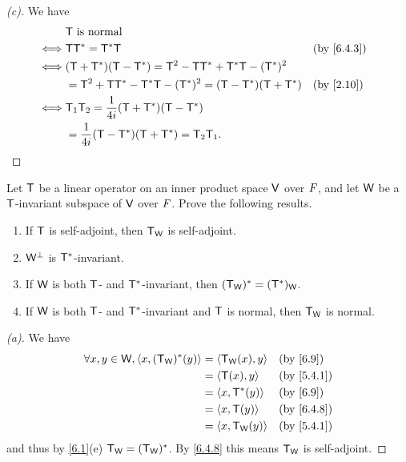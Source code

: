 \begin{proof}[(c)]
  We have
  \begin{align*}
         & \T \text{ is normal}                                                            \\
    \iff & \T \T^* = \T^* \T                                               &  & \by{6.4.3} \\
    \iff & (\T + \T^*) (\T - \T^*) = \T^2 - \T \T^* + \T^* \T - (\T^*)^2                   \\
         & = \T^2 + \T \T^* - \T^* \T - (\T^*)^2 = (\T - \T^*) (\T + \T^*) &  & \by{2.10}  \\
    \iff & \T_1 \T_2 = \frac{1}{4i} (\T + \T^*) (\T - \T^*)                                \\
         & = \frac{1}{4i} (\T - \T^*) (\T + \T^*) = \T_2 \T_1.
  \end{align*}
\end{proof}

\begin{ex}\label{ex:6.4.7}
  Let \(\mathsf{T}\) be a linear operator on an inner product space \(\mathsf{V}\) over \(\mathit{F}\), and let \(\mathsf{W}\) be a \(\mathsf{T}\)-invariant subspace of \(\mathsf{V}\) over \(\mathit{F}\).
  Prove the following results.
  \begin{enumerate}
    \item If \(\mathsf{T}\) is self-adjoint, then \(\mathsf{T}_{\mathsf{W}}\) is self-adjoint.
    \item \(\mathsf{W}^{\perp}\) is \(\mathsf{T}^*\)-invariant.
    \item If \(\mathsf{W}\) is both \(\mathsf{T}\)- and \(\mathsf{T}^*\)-invariant, then \((\mathsf{T}_{\mathsf{W}})^* = (\mathsf{T}^*)_{\mathsf{W}}\).
    \item If \(\mathsf{W}\) is both \(\mathsf{T}\)- and \(\mathsf{T}^*\)-invariant and \(\mathsf{T}\) is normal, then \(\mathsf{T}_{\mathsf{W}}\) is normal.
  \end{enumerate}
\end{ex}

\begin{proof}[(a)]
  We have
  \begin{align*}
    \forall x, y \in \W, \inn{x, (\T_{\W})^*(y)} & = \inn{\T_{\W}(x), y} &  & \by{6.9}   \\
                                                 & = \inn{\T(x), y}      &  & \by{5.4.1} \\
                                                 & = \inn{x, \T^*(y)}    &  & \by{6.9}   \\
                                                 & = \inn{x, \T(y)}      &  & \by{6.4.8} \\
                                                 & = \inn{x, \T_{\W}(y)} &  & \by{5.4.1}
  \end{align*}
  and thus by \cref{6.1}(e) \(\mathsf{T}_{\mathsf{W}} = (\mathsf{T}_{\mathsf{W}})^*\).
  By \cref{6.4.8} this means \(\mathsf{T}_{\mathsf{W}}\) is self-adjoint.
\end{proof}

